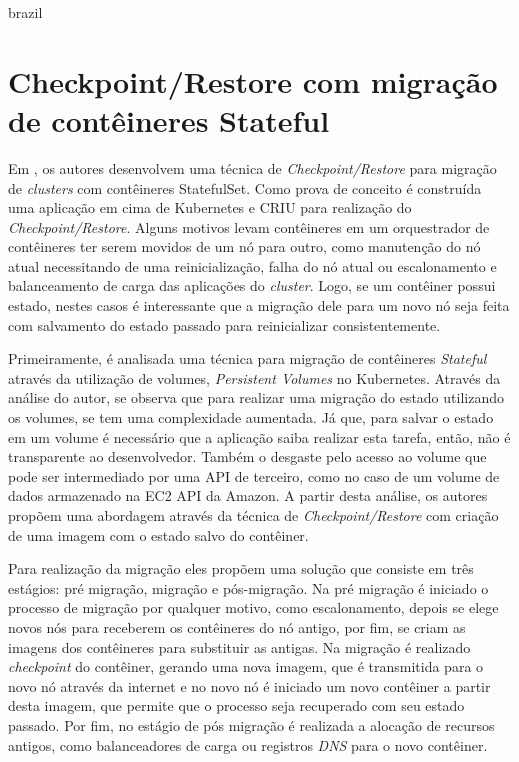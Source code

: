 \begin{otherlanguage*}{brazil}
\section{Checkpoint/Restore com migração de contêineres Stateful}

Em \cite{oh2018stateful}, os autores desenvolvem uma técnica de
\textit{Checkpoint/Restore} para migração de \textit{clusters} com contêineres
StatefulSet. Como prova de conceito é construída uma aplicação em cima de
Kubernetes e CRIU para realização do \textit{Checkpoint/Restore}. Alguns
motivos levam contêineres em um orquestrador de contêineres ter serem movidos de
um nó para outro, como manutenção do nó atual necessitando de uma
reinicialização, falha do nó atual ou escalonamento e balanceamento de carga
das aplicações do \textit{cluster}. Logo, se um contêiner possui estado,
nestes casos é interessante que a migração dele para um novo nó seja feita
com salvamento do estado passado para reinicializar consistentemente.

Primeiramente, é analisada uma técnica para migração de contêineres
\textit{Stateful} através da utilização de volumes, \textit{Persistent Volumes}
no Kubernetes. Através da análise do autor, se observa que para realizar
uma migração do estado utilizando os volumes, se tem uma complexidade aumentada.
Já que, para salvar o estado em um volume é necessário que a aplicação saiba
realizar esta tarefa, então, não é transparente ao desenvolvedor. Também o
desgaste pelo acesso ao volume que pode ser intermediado por uma API de terceiro,
como no caso de um volume de dados armazenado na EC2 API da Amazon. A partir
desta análise, os autores propõem uma abordagem através da técnica de
\textit{Checkpoint/Restore} com criação de uma imagem com o estado salvo do contêiner.

Para realização da migração eles propõem uma solução que consiste em três
estágios: pré migração, migração e pós-migração. Na pré migração é iniciado
o processo de migração por qualquer motivo, como escalonamento, depois se elege
novos nós para receberem os contêineres do nó antigo, por fim, se criam as
imagens dos contêineres para substituir as antigas. Na migração é realizado
\textit{checkpoint} do contêiner, gerando uma nova imagem, que é
transmitida para o novo nó através da internet e no novo nó é iniciado um
novo contêiner a partir desta imagem, que permite que o processo seja
recuperado com seu estado passado. Por fim, no estágio de pós migração é
realizada a alocação de recursos antigos, como balanceadores de carga ou
registros \textit{DNS} para o novo contêiner.


\end{otherlanguage*}
